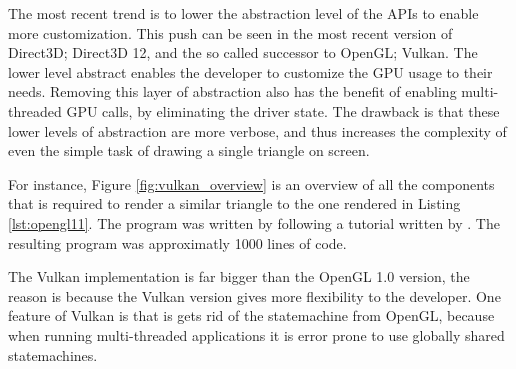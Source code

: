 The most recent trend is to lower the abstraction level of the \glspl{API} to enable more customization.
This push can be seen in the most recent version of Direct3D; Direct3D 12, and the so called successor to OpenGL; Vulkan.
The lower level abstract enables the developer to customize the \gls{GPU} usage to their needs.
Removing this layer of abstraction also has the benefit of enabling multi-threaded \gls{GPU} calls, by eliminating the driver state.
The drawback is that these lower levels of abstraction are more verbose, and thus increases the complexity of even the simple task of drawing a single triangle on screen.

For instance, Figure \ref{fig:vulkan_overview} is an overview of all the components that is required to render a similar triangle to the one rendered in Listing \ref{lst:opengl11}.
The program was written by following a tutorial written by \citet{overvoorde2017vulkan}.
The resulting program was approximatly 1000 lines of code.


The Vulkan implementation is far bigger than the OpenGL 1.0 version, the reason is because the Vulkan version gives more flexibility to the developer.
One feature of Vulkan is that is gets rid of the statemachine from OpenGL, because when running multi-threaded applications it is error prone to use globally shared statemachines.
